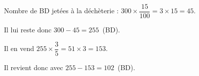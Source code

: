
\medskip
 
Nombre de BD jetées à la déchèterie : $300 \times \dfrac{15}{100} = 3 \times 15 = 45$.

Il lui reste donc $300 - 45 = 255$~(BD).

Il en vend $255 \times \dfrac{3}{5} = 51 \times 3 = 153$.

Il revient donc avec $255 - 153 = 102$~(BD).

%
%

\medskip

